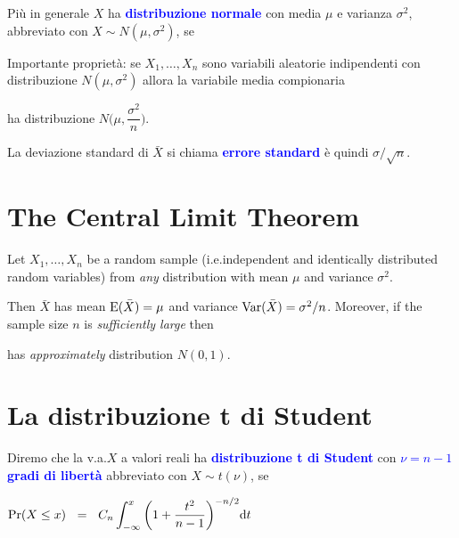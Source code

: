 \documentclass[12pt,openany]{book}
\def\E{{\rm E}}
\def\Var{{\rm Var}}
\def\emph#1{\textcolor{blue}{\textbf{\boldmath #1}}}
\theoremstyle{mio}
\theoremstyle{liscio}
\begin{document}
Più in generale $X$ ha \emph{distribuzione normale\/} con media $\mu$ e varianza $\sigma^2$, abbreviato con $X\sim N(\mu,\sigma^2)$, se

\medskip


\bigskip

Importante proprietà: se $X_1,\dots,X_n$ sono variabili aleatorie indipendenti con distribuzione $N(\mu,\sigma^2)$ allora la variabile media compionaria

\ceq{\hfill \emph{$\bar X$}}{=}{\frac1n\sum_{i=1}^n X_i}

ha distribuzione $N\Big(\mu,\dfrac{\sigma^2}{n}\Big)$. 

La deviazione standard di $\bar X$ si chiama \emph{errore standard\/} \`e quindi $\sigma/\sqrt{n}$.



\hfill{}\clearpage\section{The Central Limit Theorem}
\label{CLT}

Let $X_1,\dots, X_n$ be a random sample (i.e.\@ independent and identically distributed random variables) from \textit{any\/} distribution with mean $\mu$ and variance $\sigma^2$.

Then $\bar X$ has mean $\E(\bar X)=\mu$ and variance $\Var(\bar X)=\sigma^2/n$. Moreover, if the sample size $n$ is \textit{sufficiently large\/} then 

\ceq{\hfill \emph{$Z$}}{=}{\frac{\bar X - \mu}{\sigma/\sqrt{n}}}

has \textit{approximately\/} distribution $N(0,1)$.



\hfill{}\clearpage\section{La distribuzione t di Student}
\label{tStudent}

Diremo che la v.a.\@ $X$ a valori reali ha \emph{distribuzione t di Student\/} con \emph{$\nu=n-1$ gradi di libertà\/} abbreviato con $X\sim t(\nu)$, se

\bigskip

$\displaystyle\Pr(X\le x)\medrel{=}C_n \int_{-\infty}^x \bigg(1+\frac {t^2} {n-1}\bigg)^{-n/2} {\rm d}t$%
\end{document}

